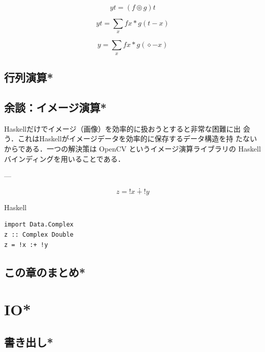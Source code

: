 \documentclass[a5paper,twoside,fleqn,draft]{jsbook}
\newcommand{\programminglanguage}[1]{\textsf{#1}}
\newcommand{\haskell}{\programminglanguage{Haskell}}
\newenvironment{haskellcode}{\begin{itembox}[r]{\haskell}}{\end{itembox}}
\newcommand{\mAnonParam}{\diamond}
\DeclareMathOperator{\mComplexPlus}{\dotplus}
\begin{document}
$$
yt=(f\circledcirc g)t
$$


$$
yt=\sum_xfx*g(t-x)
$$

$$
y=\sum_xfx*g(\mAnonParam-x)
$$

\section{行列演算*}


\section{余談：イメージ演算*}

\haskell だけでイメージ（画像）を効率的に扱おうとすると非常な困難に出
会う．これは\haskell がイメージデータを効率的に保存するデータ構造を持
たないからである．一つの解決策は OpenCV というイメージ演算ライブラリの
\haskell バインディングを用いることである．


---


\begin{equation}
z={}!x{}\mComplexPlus{}!y
\end{equation}

\begin{haskellcode}
\begin{verbatim}
import Data.Complex
z :: Complex Double
z = !x :+ !y
\end{verbatim}
\end{haskellcode}


\section{この章のまとめ*}

\chapter{IO*}
\section{書き出し*}
\end{document}
